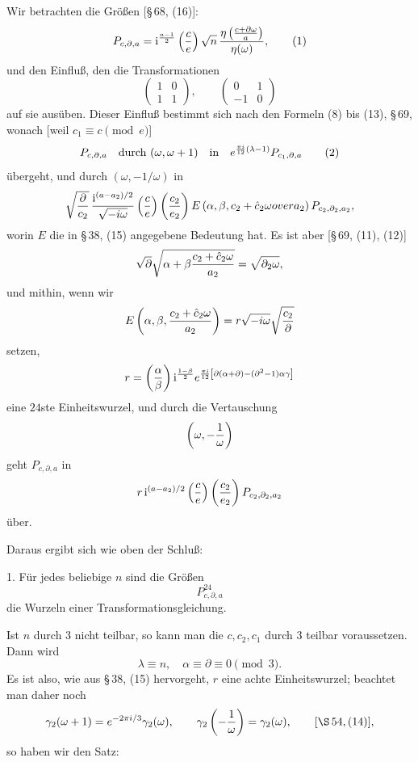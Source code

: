 \documentclass[11pt]{article}
\providecommand{\ii}{\mathrm{i}}
\begin{document}
Wir betrachten die Größen [\S\,68, (16)]:
\begin{equation}
 P_{c,\partial,a}=\ii^{\frac{a-1}{2}}\left({c\over e}\right)
 \sqrt n\,{\eta\left({c+\partial\omega\over a}\right)\over\eta(\omega)},
\tag{1}
\end{equation}
und den Einfluß, den die Transformationen
\[
 \begin{pmatrix}1&0\\1&1\end{pmatrix},
 \qquad
 \begin{pmatrix}0&1\\-1&0\end{pmatrix}
\]
auf sie ausüben. Dieser Einfluß bestimmt sich nach den Formeln (8) bis (13), \S\,69, wonach [weil $c_1\equiv c\pmod e$]
\begin{equation}
P_{c,\partial,a}\quad\hbox{durch }(\omega,\omega+1)\quad\hbox{in}\quad
 e^{{\pi i\over12}(\lambda-1)}P_{c_1,\partial,a}
\tag{2}
\end{equation}
übergeht, und durch $\left(\omega,-1/\omega\right)$ in
\[
 \sqrt{\partial\over c_2}\,{\ii^{(a-a_2)/2}\over\sqrt{-i\omega}}
 \left({c\over e}\right)\left({c_2\over e_2}\right)
 E\left(\alpha,\beta,{c_2+\hat c_2\omega
over a_2}\right)P_{c_2,\partial_2,a_2},
\]
worin $E$ die in \S\,38, (15) angegebene Bedeutung hat. Es ist aber [\S\,69, (11), (12)]
\[
 \sqrt{\partial}\sqrt{\alpha+\beta{c_2+\hat c_2\omega\over a_2}}
 =\sqrt{\partial_2\omega},
\]
und mithin, wenn wir
\[
 E\left(\alpha,\beta,{c_2+\hat c_2\omega\over a_2}\right)
 =r\sqrt{-i\omega}\sqrt{c_2\over\partial}
\]
setzen,
\[
 r=\left({\alpha\over\beta}\right)
 \ii^{\frac{1-\beta}{2}}
 e^{{\pi i\over12}\left[\partial(\alpha+\partial)-(\partial^2-1)\alpha\gamma\right]}
\]
eine $24$ste Einheitswurzel, und durch die Vertauschung
\[
 \left(\omega,-{1\over\omega}\right)
\]
geht $P_{c,\partial,a}$ in
\[
 r\,\ii^{(a-a_2)/2}\left({c\over e}\right)
 \left({c_2\over e_2}\right)P_{c_2,\partial_2,a_2}
\]
über.

Daraus ergibt sich wie oben der Schluß:

1. Für jedes beliebige $n$ sind die Größen
\[
 P_{c,\partial,a}^{24}
\]
die Wurzeln einer Transformationsgleichung.

Ist $n$ durch $3$ nicht teilbar, so kann man die $c,c_2,c_1$ durch $3$ teilbar voraussetzen. Dann wird
\[
 \lambda\equiv n,
 \quad \alpha\equiv\partial\equiv0\pmod3.
\]
Es ist also, wie aus \S\,38, (15) hervorgeht, $r$ eine achte Einheitswurzel; beachtet man daher noch
\[
 \gamma_2(\omega+1)=e^{-2\pi i/3}\gamma_2(\omega),
 \qquad
 \gamma_2\left(-{1\over\omega}\right)=\gamma_2(\omega),
 \qquad [\S\,54,(14)],
\]
so haben wir den Satz:
\end{document}
